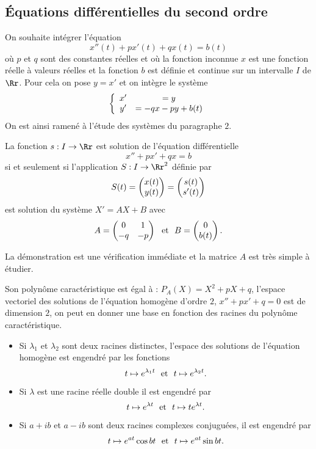 \documentclass[class=report,crop=false]{standalone}
\begin{document}
\subsection{\'Equations différentielles du second ordre}

On souhaite intégrer l'équation
$$x''(t)+px'(t)+qx(t)=b(t)$$
où $p$ et $q$ sont des constantes réelles et où la fonction inconnue $x$ 
est une fonction réelle à valeurs réelles et la fonction $b$ est définie 
et continue sur un intervalle $I$ de $\Rr$. Pour cela on pose $y=x'$ et 
on intègre le système
$$\left\{\begin{array}{cc}x'&=y\cr y'&=-qx-py+b(t)\end{array}\right.$$
On est ainsi ramené à l'étude des systèmes du paragraphe $2$.

\begin{proposition}
La fonction $s: I\rightarrow \Rr$ est solution de l'équation différentielle 
$$x''+px'+qx=b$$ si et seulement si l'application $S : I\rightarrow \Rr^2$ définie par 
$$S(t)=\left(\begin{matrix}x(t)\cr y(t)\end{matrix}\right)=\left(\begin{matrix}s(t)\cr s'(t)\end{matrix}\right)$$ est solution du système
$X'=AX+B$ avec
$$A=\left(\begin{matrix}0&1\cr-q&-p\end{matrix}\right)\ \ {\hbox{et}}\ \ 
B=\left(\begin{matrix}0\cr b(t)\end{matrix}\right).$$ 
\end{proposition} 


La démonstration est une vérification immédiate et la matrice $A$ est très simple à étudier.

Son polynôme caractéristique est égal à : $P_A(X)=X^2+pX+q$, 
l'espace vectoriel des solutions de l'équation homogène d'ordre $2$, 
$x''+px'+q=0$ est de dimension $2$, on peut en donner une base en fonction 
des racines du polynôme caractéristique.

\begin{itemize}
  \item Si $\lambda_1$ et $\lambda_2$ sont deux racines distinctes, 
l'espace des solutions de l'équation  homogène est engendré par les fonctions
$$t\mapsto e^{\lambda_1t}\ \ {\hbox{et}}\ \ t\mapsto e^{\lambda_2t}.$$
  
  \item Si $\lambda$ est une racine réelle double il est engendré par
$$t\mapsto e^{\lambda t}\ \ {\hbox{et}}\ \ t\mapsto te^{\lambda t}.$$
  
  \item Si $a+ib$ et $a-ib$ sont deux racines complexes conjuguées, il est engendré par
$$t\mapsto e^{at}\cos bt\ \ {\hbox{et}}\ \ t\mapsto e^{at}\sin bt.$$
\end{itemize}
\end{document}

